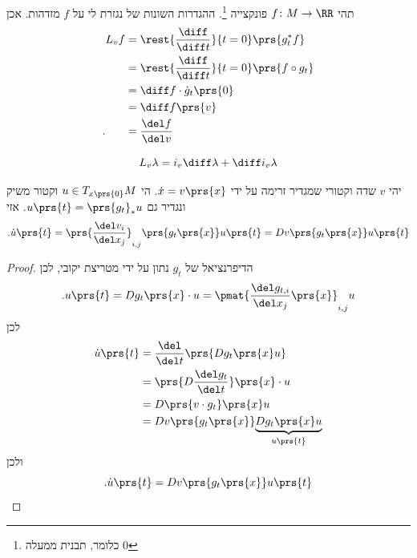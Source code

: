 \documentclass[a4paper,10pt,twoside,openany]{book}
\begin{document}
\begin{remark}
תהי
$f \colon M \to \RR$
פונקצייה%
\footnote{כלומר, תבנית ממעלה
$0$}.
ההגדרות השונות של נגזרת לי על
$f$
מזדהות.
אכן
\begin{align*}
L_v f &= \rest{\frac{\diff}{\diff t}}{t=0} \prs{g_t^* f} \\&= \rest{\frac{\diff}{\diff t}}{t=0} \prs{f \circ g_t} \\&= \diff f \cdot \dot{g}_t\prs{0} \\&= \diff f\prs{v} \\ \text{.} \phantom{L_v f} &=  \frac{\del f}{\del v}
\end{align*}
\end{remark}

\begin{theorem}
\[L_v \lambda = i_v \diff \lambda + \diff i_v \lambda\]
\end{theorem}

\begin{lemma}
יהי
$v$
שדה וקטורי שמגדיר זרימה על ידי
$\dot{x} = v\prs{x}$.
הי
$u \in T_{x\prs{0}} M$
וקטור משיק ונגדיר גם
$u\prs{t} = \prs{g_t}_* u$.
אזי
\begin{align*}
\text{.}\dot{u}\prs{t} = \prs{\frac{\del v_i}{\del x_j}}_{i,j} \prs{g_t\prs{x}} u\prs{t} = Dv\prs{g_t\prs{x}} u\prs{t}
\end{align*}
\end{lemma}

\begin{proof}
הדיפרנציאל של
$g_t$
נתון על ידי מטריצת יקובי, לכן
\[\text{.} u\prs{t} = Dg_t\prs{x} \cdot u = \pmat{\frac{\del g_{t,i}}{\del x_j}\prs{x}}_{i,j} u\]
לכן
\begin{align*}
\dot{u}\prs{t} &= \frac{\del}{\del t}\prs{D g_t\prs{x} u} \\&= \prs{D \frac{\del g_t}{\del t}} \prs{x} \cdot u \\&= D\prs{v \cdot g_t}\prs{x} u \\&= Dv\prs{g_t\prs{x}} \underset{u\prs{t}}{\underbrace{Dg_t\prs{x} u}}
\end{align*}
ולכן
\[\text{.} \dot{u}\prs{t} = Dv\prs{g_t\prs{x}} u\prs{t}\]
\end{proof}
\end{document}
